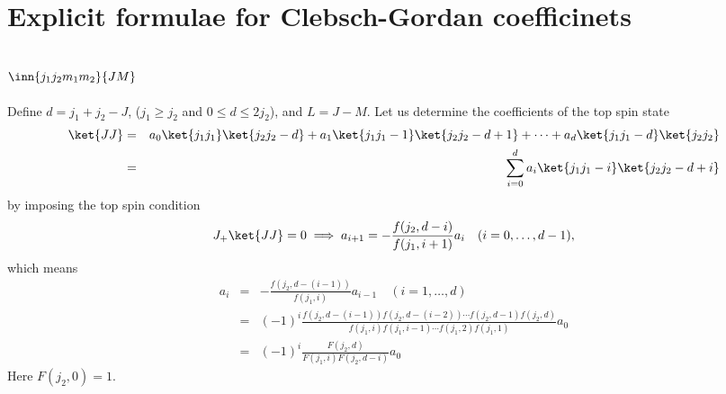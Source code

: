 \documentclass{article}
\begin{document}
{\section{Explicit formulae for Clebsch-Gordan coefficinets}
\label{sec-5}
\subsection{$\inn{j_1j_2m_1m_2}{JM}$}
\label{sec-5-1}
Define $d=j_1+j_2 -J$, ($j_1 \ge j_2$ and $0\le d \le 2j_2$), and $L = J-M$. Let us determine the coefficients of the top spin state
\begin{eqnarray}
\ket{JJ}  &=&  a_0\ket{j_1j_1}\ket{j_2j_2-d} + a_1\ket{j_1j_1-1}\ket{j_2j_2-d+1} + \cdots + a_d\ket{j_1j_1-d}\ket{j_2j_2} \nonumber\\
 & = & \sum_{i=0}^{d} a_i\ket{j_1j_1-i}\ket{j_2j_2-d+i}
\end{eqnarray}
by imposing the top spin condition
\begin{equation}
\label{ }
J_{+}\ket{JJ}  =  0 \implies a_{i+1}=-\frac{f(j_2,d-i)}{f(j_1,i+1)}a_i \quad (i=0,\ldots,d-1),
\end{equation}
which means
\begin{eqnarray}
 a_{i} & = & -\frac{f(j_2,d-(i-1))}{f(j_1,i)}a_{i-1} \quad (i=1,\ldots,d)\\
       & = & (-1)^i\frac{f(j_2,d-(i-1))f(j_2,d-(i-2)) \cdots f(j_2,d-1)f(j_2,d)}{f(j_1,i)f(j_1,i-1) \cdots f(j_1,2)f(j_1,1)}a_{0} \\
       & = & (-1)^i\frac{F(j_2,d)}{F(j_1,i)F(j_2,d-i)} a_{0} 
\end{eqnarray}
Here $F(j_2,0)=1$.
}
\end{document}
